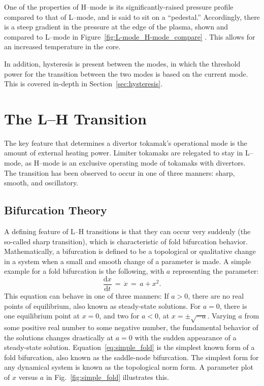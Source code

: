 One of the properties of H--mode is its significantly-raised pressure profile compared to that of L--mode, and is said to sit on a ``pedestal.''
Accordingly, there is a steep gradient in the pressure at the edge of the plasma, shown and compared to L--mode in Figure~\ref{fig:L-mode_H-mode_compare} \cite{weymiens_bifurcation_2014}.
This allows for an increased temperature in the core.

In addition, hysteresis is present between the modes, in which the threshold power for the transition between the two modes is based on the current mode.
This is covered in-depth in Section~\ref{sec:hysteresis}.

\section{The L--H Transition}\label{sec:the_transition}
The key feature that determines a divertor tokamak's operational mode is the amount of external heating power.
Limiter tokamaks are relegated to stay in L--mode, as H--mode is an exclusive operating mode of tokamaks with divertors.
The transition has been observed to occur in one of three manners: sharp, smooth, and oscillatory.

\subsection{Bifurcation Theory}\label{sec:bif_theory}
A defining feature of L--H transitions is that they can occur very suddenly (the so-called sharp transition), which is characteristic of fold bifurcation behavior.
Mathematically, a bifurcation is defined to be a topological or qualitative change in a system when a small and smooth change of a parameter is made.
A simple example for a fold bifurcation is the following, with $a$ representing the parameter:
\begin{equation} %
	\frac{\text{d}x}{\text{d}t} \,=\, \dot{x} \,=\, a + x^2.
	\label{eq:simple_fold}
\end{equation}
This equation can behave in one of three manners:
If $a > 0$, there are no real points of equilibrium, also known as steady-state solutions.
For $a = 0$, there is one equilibrium point at $x = 0$, and two for $a < 0$, at $x = \pm\sqrt{-a}$.
Varying $a$ from some positive real number to some negative number, the fundamental behavior of the solutions changes drastically at $a = 0$ with the sudden appearance of a steady-state solution.
Equation~\ref{eq:simple_fold} is the simplest known form of a fold bifurcation, also known as the saddle-node bifurcation.
The simplest form for any dynamical system is known as the topological norm form.
A parameter plot of $x$ versus $a$ in Fig.~\ref{fig:simple_fold} illustrates this.

